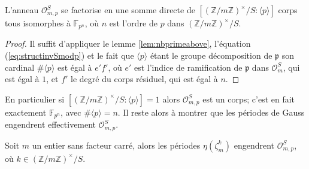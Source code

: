 \documentclass[a4paper]{article} %
\numberwithin{section}{part}
\numberwithin{equation}{section}
\newcommand\zmodninv[1]{(\mathbb{Z}/#1\mathbb{Z})^{\times}}
\newcommand\GF[1]{\mathbb{F}_{#1}}
\newcommand\EO{\mathcal{O}}
\newcommand\groupgen[1]{\langle{#1}\rangle}
\begin{document}
\begin{cor}
L'anneau $\EO_{m,p}^S$ se factorise en une somme directe de
$[\zmodninv{m}/S:\groupgen{p}]$ corps tous isomorphes à $\GF{p^n}$, où $n$ est 
l'ordre de $p$ dans $\zmodninv{m}/S$.
\end{cor}
\begin{proof}
Il suffit d'appliquer le lemme \ref{lem:nbprimeabove}, l'équation
(\ref{eq:structinvSmodp}) et le fait que $\groupgen{p}$ étant le groupe
décomposition de $\mathfrak{p}$ son cardinal $\#\groupgen{p}$ est égal à $e'f'$,
où $e'$ est l'indice de ramification de $\mathfrak{p}$ dans $\EO_m^S$, qui est 
égal à $1$, et $f'$ le degré du corps résiduel, qui est égal à $n$.
\end{proof}
En particulier si $[\zmodninv{m}/S:\groupgen{p}] = 1$ alors $\EO_{m,p}^S$ est
un corps; c'est en fait exactement $\GF{p^n}$, avec $\#\groupgen{p} = n$. Il 
reste alors à montrer que les périodes de Gauss engendrent effectivement 
$\EO_{m,p}^S$.
\begin{lem}
Soit $m$ un entier sans facteur carré, alors les périodes $\eta(\zeta_m^k)$
engendrent $\EO_{m,p}^S$, où $k\in\zmodninv{m}/S$.
\end{lem}
\end{document}
